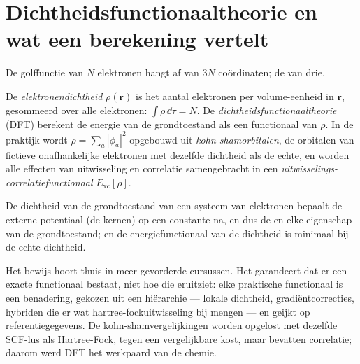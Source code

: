 \section{Dichtheidsfunctionaaltheorie en wat een berekening vertelt}

De golffunctie van $N$ elektronen hangt af van $3N$ coördinaten; de
 van drie.

\begin{definition}\label{def:b3:computational-chemistry:dft}
De \emph{elektronendichtheid} $\rho(\mathbf r)$ is het
aantal elektronen per volume-eenheid in $\mathbf r$, gesommeerd over alle
elektronen:
$\int\rho\,\dd\tau = N$. De
\emph{dichtheidsfunctionaaltheorie}
(DFT) berekent de energie van de grondtoestand als een functionaal van
$\rho$. In de praktijk wordt $\rho = \sum_a|\phi_a|^2$ opgebouwd uit
\emph{kohn-shamorbitalen}, de orbitalen van
fictieve onafhankelijke elektronen met dezelfde dichtheid als de echte, en
worden alle effecten van uitwisseling en correlatie samengebracht in een
\emph{uitwisselings-correlatiefunctionaal}
$E_{\mathrm{xc}}[\rho]$.
\end{definition}

\begin{theorem}\label{thm:b3:computational-chemistry:hohenberg-kohn}
De dichtheid van de grondtoestand van een systeem van elektronen bepaalt
de externe potentiaal (de kernen) op een constante na, en dus de
 en elke eigenschap van de grondtoestand; en de
energiefunctionaal van de dichtheid is minimaal bij de echte dichtheid.
\end{theorem}
\admitted

Het bewijs hoort thuis in meer gevorderde cursussen. Het garandeert dat er
een exacte functionaal bestaat, niet hoe die eruitziet: elke praktische
functionaal is een benadering, gekozen uit een hiërarchie --- lokale
dichtheid, gradiëntcorrecties, hybriden die er wat hartree-fockuitwisseling
bij mengen --- en geijkt op referentiegegevens. De kohn-shamvergelijkingen
worden opgelost met dezelfde SCF-lus als Hartree-Fock, tegen een
vergelijkbare kost, maar bevatten correlatie; daarom werd DFT het
werkpaard van de chemie.

